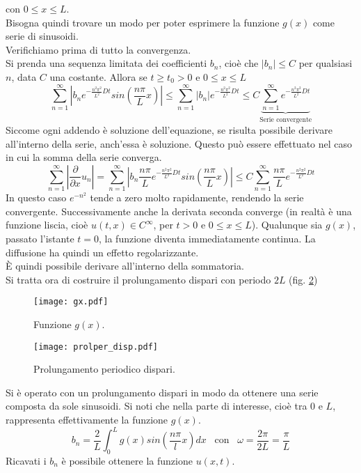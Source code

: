 con $0\leq x \leq L$.\\
Bisogna quindi trovare un modo per poter esprimere la funzione $g(x)$
come serie di sinusoidi.\\
Verifichiamo prima di tutto la convergenza.\\
Si prenda una sequenza limitata dei coefficienti $b_n$, cio\`e che
$|b_n|\leq C$ per qualsiasi $n$, data $C$ una costante. Allora se $t \geq t_0 >
0$
e $0\leq x \leq L$
\[
	\sum_{n=1}^{\infty}\left| b_n e^{-\frac{n^2\pi^2}{L^2} Dt}
	sin\left(\frac{n\pi}{L}x \right)\right|
	\leq
	\sum_{n=1}^{\infty}\left| b_n \right| e^{-\frac{n^2\pi^2}{L^2} Dt}
	\leq
	C \underbrace{\sum_{n=1}^{\infty}e^{-\frac{n^2\pi^2}{L^2} Dt}}
	_\text{Serie convergente}
\]
Siccome ogni addendo \`e soluzione dell'equazione, se risulta possibile
derivare all'interno della serie, anch'essa \`e soluzione. Questo pu\`o essere
effettuato nel caso in cui la somma della serie converga.
\[
	\sum_{n=1}^{\infty}\left| \frac{\partial}{\partial x} u_n \right|=
	\sum_{n=1}^{\infty}\left| b_n \frac{n\pi}{L}
	e^{-\frac{n^2\pi^2}{L^2} Dt}
	sin\left(\frac{n\pi}{L}x \right)\right|
	\leq
	C \sum_{n=1}^{\infty} \frac{n\pi}{L} e^{-\frac{n^2\pi^2}{L^2} Dt}
\]
In questo caso $e^{-n^2}$ tende a zero molto rapidamente, rendendo la serie
convergente. Successivamente anche la derivata seconda converge
(in realt\`a \`e una funzione liscia, cio\`e $u(t,x)\in C^\infty$,
per $t>0$ e $0\leq x \leq L$).
Qualunque sia $g(x)$, passato l'istante $t=0$, la funzione diventa
immediatamente
continua. La diffusione ha quindi un effetto regolarizzante.\\
\`E quindi possibile derivare all'interno della sommatoria.\\
Si tratta ora di costruire il prolungamento dispari con periodo $2L$ (fig.
\ref{prolper_disp})
\begin{figure}[H]
	\centering
	\texttt{[image: gx.pdf]}
	\caption{Funzione $g(x)$.}
	\label{gx}
\end{figure}
\begin{figure}[H]
	\centering
	\texttt{[image: prolper\_disp.pdf]}
	\caption{Prolungamento periodico dispari.}
	\label{prolper_disp}
\end{figure}
\noindent
Si \`e operato con un prolungamento dispari in modo da ottenere una serie
composta
da sole sinusoidi. Si noti che nella parte di interesse, cio\`e tra $0$ e $L$,
rappresenta effettivamente la funzione $g(x)$.
\[
	b_n= \frac{2}{L}\int_0^L g(x)sin \left(\frac{n\pi}{l} x\right) dx
	\;\;\; \text{con} \;\;\;
	\omega= \frac{2\pi}{2L}= \frac{\pi}{L}
\]
Ricavati i $b_n$ \`e possibile ottenere la funzione $u(x,t)$.

